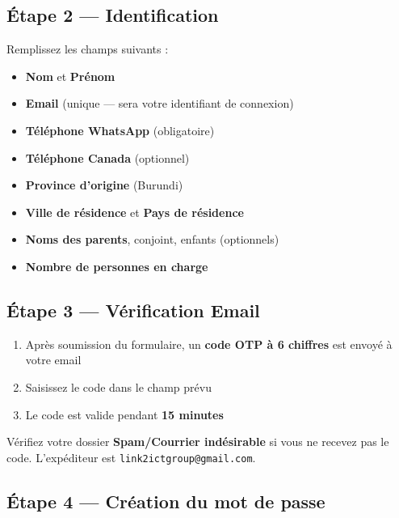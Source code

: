 \documentclass[12pt,a4paper]{article}
\begin{document}
\subsection{Étape 2 — Identification}

\begin{etapebox}
Remplissez les champs suivants :
\begin{itemize}[leftmargin=1.5em]
    \item \textbf{Nom} et \textbf{Prénom}
    \item \textbf{Email} (unique — sera votre identifiant de connexion)
    \item \textbf{Téléphone WhatsApp} (obligatoire)
    \item \textbf{Téléphone Canada} (optionnel)
    \item \textbf{Province d'origine} (Burundi)
    \item \textbf{Ville de résidence} et \textbf{Pays de résidence}
    \item \textbf{Noms des parents}, conjoint, enfants (optionnels)
    \item \textbf{Nombre de personnes en charge}
\end{itemize}
\end{etapebox}

\subsection{Étape 3 — Vérification Email}

\begin{enumerate}
    \item Après soumission du formulaire, un \textbf{code OTP à 6 chiffres} est envoyé à votre email
    \item Saisissez le code dans le champ prévu
    \item Le code est valide pendant \textbf{15 minutes}
\end{enumerate}

\begin{astucebox}[Astuce]
Vérifiez votre dossier \textbf{Spam/Courrier indésirable} si vous ne recevez pas le code. L'expéditeur est \texttt{link2ictgroup@gmail.com}.
\end{astucebox}

\subsection{Étape 4 — Création du mot de passe}
\end{document}
